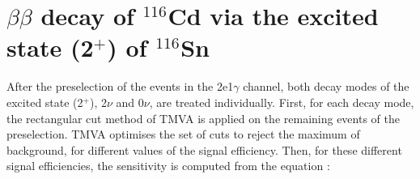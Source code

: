 \documentclass[main.tex]{subfiles}
\begin{document}


\FloatBarrier


\section{$\beta\beta$ decay of $^{\text{116}}$Cd via the excited state (2$^+$) of $^{\text{116}}$Sn}\label{sec:Result2PLUS}


\NI After the preselection of the events in the 2e1$\gamma$ channel, both decay modes of the excited state (2$^+$), 2$\nu$ and 0$\nu$, are treated individually. First, for each decay mode, the rectangular cut method of TMVA is applied on the remaining events of the preselection. TMVA optimises the set of cuts to reject the maximum of background, for different values of the signal efficiency. Then, for these different signal efficiencies, the sensitivity is computed from the equation : 
\end{document}
